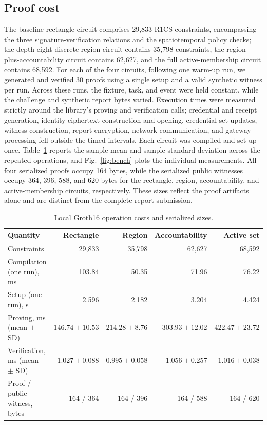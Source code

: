 \documentclass[pdflatex,iicol,sn-mathphys-num]{sn-jnl}
\begin{document}
\subsection{Proof cost}
The baseline rectangle circuit comprises 29,833 R1CS constraints, encompassing the three signature-verification relations and the spatiotemporal policy checks; the depth-eight discrete-region circuit contains 35,798 constraints, the region-plus-accountability circuit contains 62,627, and the full active-membership circuit contains 68,592. For each of the four circuits, following one warm-up run, we generated and verified 30 proofs using a single setup and a valid synthetic witness per run. Across these runs, the fixture, task, and event were held constant, while the challenge and synthetic report bytes varied. Execution times were measured strictly around the library's proving and verification calls; credential and receipt generation, identity-ciphertext construction and opening, credential-set updates, witness construction, report encryption, network communication, and gateway processing fell outside the timed intervals. Each circuit was compiled and set up once. Table~\ref{tab:cost} reports the sample mean and sample standard deviation across the repeated operations, and Fig.~\ref{fig:bench} plots the individual measurements. All four serialized proofs occupy 164 bytes, while the serialized public witnesses occupy 364, 396, 588, and 620 bytes for the rectangle, region, accountability, and active-membership circuits, respectively. These sizes reflect the proof artifacts alone and are distinct from the complete report submission.

\begin{table}[t]
\centering\small\caption{Local Groth16 operation costs and serialized sizes.}\label{tab:cost}
\begin{tabular}{@{}lrrrr@{}}\toprule
Quantity & Rectangle & Region & Accountability & Active set \\\midrule
Constraints & 29,833 & 35,798 & 62,627 & 68,592 \\
Compilation (one run), ms & 103.84 & 50.35 & 71.96 & 76.22 \\
Setup (one run), s & 2.596 & 2.182 & 3.204 & 4.424 \\
Proving, ms (mean $\pm$ SD) & $146.74\pm10.53$ & $214.28\pm8.76$ & $303.93\pm12.02$ & $422.47\pm23.72$ \\
Verification, ms (mean $\pm$ SD) & $1.027\pm0.088$ & $0.995\pm0.058$ & $1.056\pm0.257$ & $1.016\pm0.038$ \\
Proof / public witness, bytes & 164 / 364 & 164 / 396 & 164 / 588 & 164 / 620 \\\bottomrule
\end{tabular}
\end{table}
\end{document}
